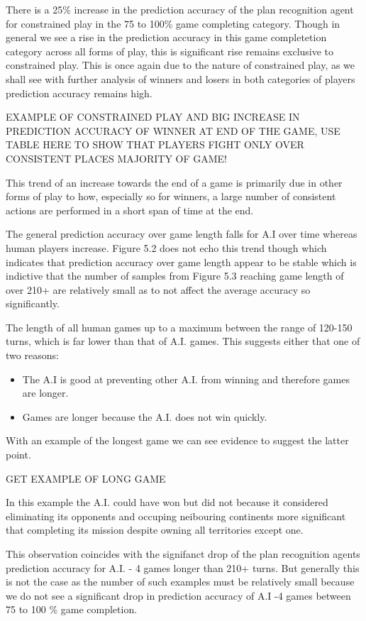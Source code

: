 \documentclass[parskip]{cs4rep}
\begin{document}
There is a 25\% increase in the prediction accuracy of the plan recognition agent for constrained play in the 75 to 100\% game completing category. Though in general we see a rise in the prediction accuracy in this game completetion category across all forms of play, this is significant rise remains exclusive to constrained play. This is once again due to the nature of constrained play, as we shall see with further analysis of winners and losers in both categories of players prediction accuracy remains high.

EXAMPLE OF CONSTRAINED PLAY AND BIG INCREASE IN PREDICTION ACCURACY OF WINNER AT END OF THE GAME, USE TABLE HERE TO SHOW THAT PLAYERS FIGHT ONLY OVER CONSISTENT PLACES MAJORITY OF GAME!

This trend of an increase towards the end of a game is primarily due in other forms of play to how, especially so for winners, a large number of consistent actions are performed in a short span of time at the end.

The general prediction accuracy over game length falls for A.I over time whereas human players increase. Figure 5.2 does not echo this trend though which indicates that prediction accuracy over game length appear to be stable which is indictive that the number of samples from Figure 5.3 reaching game length of over 210+ are relatively small as to not affect the average accuracy so significantly. 

The length of all human games up to a maximum between the range of 120-150 turns, which is far lower than that of A.I. games. This suggests either that one of two reasons:

\begin{itemize}
\item
The A.I is good at preventing other A.I. from winning and therefore games are longer.
\item
Games are longer because the A.I. does not win quickly.
\end{itemize}

With an example of the longest game we can see evidence to suggest the latter point.

GET EXAMPLE OF LONG GAME

In this example the A.I. could have won but did not because it considered eliminating its opponents and occuping neibouring continents more significant that completing its mission despite owning all territories except one.

This observation coincides with the signifanct drop of the plan recognition agents prediction accuracy for A.I. - 4 games longer than 210+ turns. But generally this is not the case as the number of such examples must be relatively small because we do not see a significant drop in prediction accuracy of A.I -4 games between 75 to 100 \% game completion.
\end{document}
